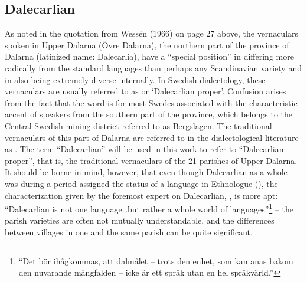 
\subsection{ Dalecarlian}

As noted in the quotation from Wessén (1966) on page 27 above, the vernaculars spoken in Upper Dalarna (Övre Dalarna), the northern part of the province of Dalarna (latinized name: Dalecarlia), have a “special position” in differing more radically from the standard languages than perhaps any Scandinavian variety and in also being extremely diverse internally. In Swedish dialectology, these vernaculars are usually referred to as  or ‘Dalecarlian proper’. Confusion arises from the fact that the word  is for most Swedes associated with the characteristic accent of speakers from the southern part of the province, which belongs to the Central Swedish mining district referred to as Bergslagen. The traditional vernaculars of this part of Dalarna are referred to in the dialectological literature as . The term “Dalecarlian” will be used in this work to refer to “Dalecarlian proper”, that is, the traditional vernaculars of the 21 parishes of Upper Dalarna. It should be borne in mind, however, that even though Dalecarlian as a whole was during a period  assigned the status of a language in Ethnologue (\href{http://www.ethnologue.com}{}), the characterization given by the foremost expert on Dalecarlian, \citet[257]{Levander1928}, is more apt: “Dalecarlian is not one language…but rather a whole world of languages”\footnote{\textsuperscript{ }“Det bör ihågkommas, att dalmålet – trots den enhet, som kan anas bakom den nuvarande mångfalden – icke är ett språk utan en hel språkvärld.”} – the parish varieties are often not mutually understandable, and the differences between villages in one and the same parish can be quite significant. 


